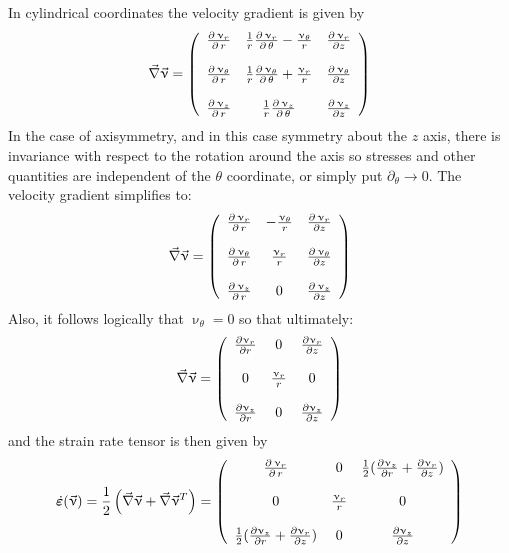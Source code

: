In cylindrical coordinates the velocity gradient is given by 
\[
\vec\nabla \vec{\upnu}  =
\left(
\begin{array}{ccc}
{\partial \, \upnu_r \over \partial \, r} &
{1 \over r} {\partial \, \upnu_r \over \partial \, \theta} - {\upnu_{\theta} \over r} &
{\partial \, \upnu_r \over \partial z} \\
\\
{\partial \, \upnu_{\theta} \over \partial \, r} &
{1 \over r} {\partial \, \upnu_{\theta} \over \partial \, \theta} + 
{\upnu_r \over r} &
{\partial \, \upnu_{\theta} \over \partial z} \\
\\
{\partial \, \upnu_{z} \over \partial \, r} &
{1 \over r} {\partial \, \upnu_{z} \over \partial \, \theta} &
{\partial \, \upnu_{z} \over \partial z}
\end{array}
\right)
\]
In the case of axisymmetry, and in this case symmetry about the $z$ axis, there is invariance with respect to the rotation around the axis so stresses and other quantities are independent of the $\theta$ coordinate, or simply put $\partial_\theta \rightarrow 0$.
The velocity gradient simplifies to:
\[
\vec\nabla \vec{\upnu}  =
\left(
\begin{array}{ccc}
{\partial \, \upnu_r \over \partial \, r} &
- {\upnu_{\theta} \over r} &
{\partial \, \upnu_r \over \partial z} \\
\\
{\partial \, \upnu_{\theta} \over \partial \, r} &
{\upnu_r \over r} &
{\partial \, \upnu_{\theta} \over \partial z} \\
\\
{\partial \, \upnu_{z} \over \partial \, r} &
0 &
{\partial \, \upnu_{z} \over \partial z}
\end{array}
\right)
\]
Also, it follows logically that $\upnu_\theta=0$ so that ultimately:
\[
\vec\nabla \vec{\upnu}  =
\left(
\begin{array}{ccc}
\frac{\partial \upnu_r}{\partial r} & 0 & {\partial \upnu_r \over \partial z} \\\\
0 & {\upnu_r \over r} & 0 \\ \\
{\partial \upnu_{z} \over \partial  r} & 0 & {\partial  \upnu_{z} \over \partial z}
\end{array}
\right)
\]
and the strain rate tensor is then given by 
\begin{equation}
\dot{\bm \varepsilon}(\vec{\upnu})
=\frac12\left(\vec\nabla \vec{\upnu}+\vec\nabla \vec{\upnu}^T\right)
=
\left(
\begin{array}{ccc}
{\partial \, \upnu_r \over \partial \, r} &
0 &
\frac12({\partial \upnu_{z} \over \partial r} + {\partial \upnu_r \over \partial z}) \\ \\
0 & {\upnu_r \over r} & 0 \\ \\
\frac12({\partial \upnu_{z} \over \partial r} + {\partial \upnu_r \over \partial z} ) & 0 & {\partial \upnu_{z} \over \partial z} 
\end{array}
\right)
\end{equation}
